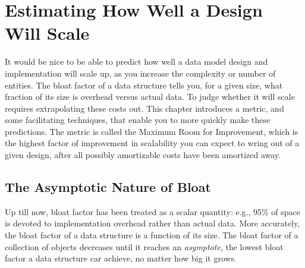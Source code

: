 \chapter{Estimating How Well a Design Will Scale}
\label{chapter:estimating-scalability}

It would be nice to be able to predict how well a data model design and
implementation will scale up, as you increase the complexity or number of
entities. The bloat factor of a data structure tells you, for a given size, what
fraction of its size is overhead versus actual data. To judge whether it will
scale requires extrapolating these costs out. This chapter introduces a metric,
and some facilitating techniques, that enable you to more quickly make these
predictions. The metric is called the Maximum Room for Improvement, which is the highest factor of improvement in scalability
you can expect to wring out of a given design, after all possibly amortizable
costs have been amortized away.

\section{The Asymptotic Nature of Bloat}
Up till now, bloat factor has been treated as a scalar quantity: e.g., 95\% of
space is devoted to implementation overhead rather than actual data. More
accurately, the bloat factor of a data structure is a function of its size. The
bloat factor of a collection of objects decreases until it reaches an
\emph{asymptote}, the lowest bloat factor a data structure car achieve, no
matter how big it grows.


